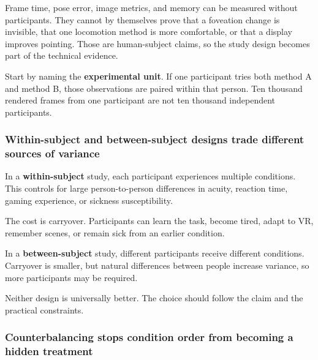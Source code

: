 \hypertarget{04-visual-computing-ii-ch035-an-xr-user-study-is-an-experiment-with-people-not-a-benchmark-loop-with-extra-columns}{}

Frame time, pose error, image metrics, and memory can be measured without participants. They cannot by themselves prove that a foveation change is invisible, that one locomotion method is more comfortable, or that a display improves pointing. Those are human-subject claims, so the study design becomes part of the technical evidence.

Start by naming the \textbf{experimental unit}. If one participant tries both method A and method B, those observations are paired within that person. Ten thousand rendered frames from one participant are not ten thousand independent participants.

\subsubsection{Within-subject and between-subject designs trade different sources of variance}\label{04-visual-computing-ii-ch035-within-subject-and-between-subject-designs-trade-different-sources-of-variance}

\hypertarget{04-visual-computing-ii-ch035-within-subject-and-between-subject-designs-trade-different-sources-of-variance}{}

In a \textbf{within-subject} study, each participant experiences multiple conditions. This controls for large person-to-person differences in acuity, reaction time, gaming experience, or sickness susceptibility.

The cost is carryover. Participants can learn the task, become tired, adapt to VR, remember scenes, or remain sick from an earlier condition.

In a \textbf{between-subject} study, different participants receive different conditions. Carryover is smaller, but natural differences between people increase variance, so more participants may be required.

Neither design is universally better. The choice should follow the claim and the practical constraints.

\subsubsection{Counterbalancing stops condition order from becoming a hidden treatment}\label{04-visual-computing-ii-ch035-counterbalancing-stops-condition-order-from-becoming-a-hidden-treatment}

